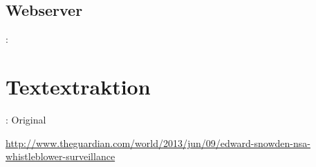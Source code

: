 \documentclass[12pt, utf8, ngerman]{beamer}
\begin{document}
\subsection{Webserver}
\begin{frame}{\insertsection: \insertsubsection}
\end{frame}


\section{Textextraktion}

\begin{frame}{\insertsection: Original}

    \scriptsize
    \vspace{.1cm}
    \url{http://www.theguardian.com/world/2013/jun/09/edward-snowden-nsa-whistleblower-surveillance}
\end{frame}
\end{document}
